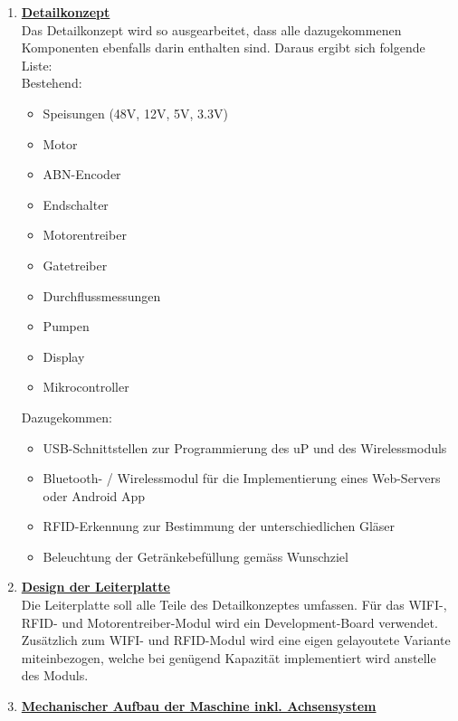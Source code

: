 \begin{enumerate}

\item \underline{\textbf{Detailkonzept}}\mbox{}\\

Das Detailkonzept wird so ausgearbeitet, dass alle dazugekommenen Komponenten ebenfalls darin enthalten sind. Daraus ergibt sich folgende Liste:\\

Bestehend:
\begin{itemize}
\item Speisungen (48V, 12V, 5V, 3.3V)
\item Motor
\item ABN-Encoder
\item Endschalter
\item Motorentreiber
\item Gatetreiber
\item Durchflussmessungen
\item Pumpen
\item Display
\item Mikrocontroller\\
\end{itemize}

Dazugekommen:

\begin{itemize}
\item USB-Schnittstellen zur Programmierung des uP und des Wirelessmoduls 
\item Bluetooth- / Wirelessmodul für die Implementierung eines Web-Servers oder Android App
\item RFID-Erkennung zur Bestimmung der unterschiedlichen Gläser
\item Beleuchtung der Getränkebefüllung gemäss Wunschziel\\
\end{itemize}

\item \underline{\textbf{Design der Leiterplatte}}\mbox{}\\

Die Leiterplatte soll alle Teile des Detailkonzeptes umfassen. Für das WIFI-, RFID- und Motorentreiber-Modul wird ein Development-Board verwendet. Zusätzlich zum WIFI- und RFID-Modul wird eine eigen gelayoutete Variante miteinbezogen, welche bei genügend Kapazität implementiert wird anstelle des Moduls.\\

\item \underline{\textbf{Mechanischer Aufbau der Maschine inkl. Achsensystem}}\mbox{}\\


\end{enumerate}
